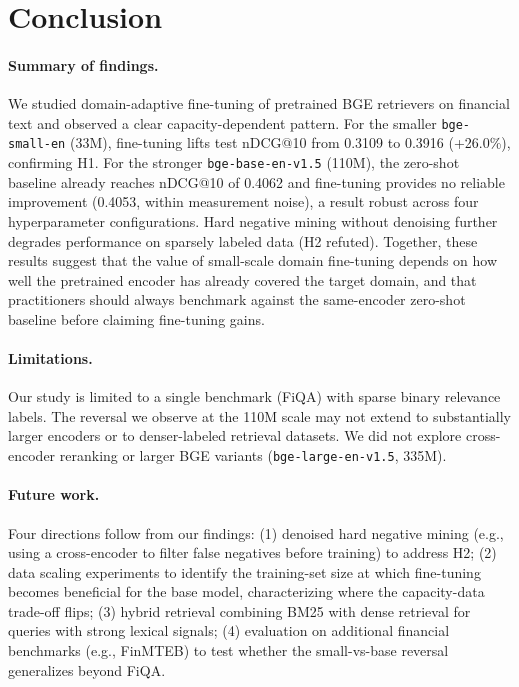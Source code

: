 \documentclass{article} %
\begin{document}
\section{Conclusion}

\paragraph{Summary of findings.}
We studied domain-adaptive fine-tuning of pretrained BGE retrievers on financial text and observed a clear capacity-dependent pattern.
For the smaller \texttt{bge-small-en} (33M), fine-tuning lifts test nDCG@10 from 0.3109 to 0.3916 (+26.0\%), confirming H1.
For the stronger \texttt{bge-base-en-v1.5} (110M), the zero-shot baseline already reaches nDCG@10 of 0.4062 and fine-tuning provides no reliable improvement (0.4053, within measurement noise), a result robust across four hyperparameter configurations.
Hard negative mining without denoising further degrades performance on sparsely labeled data (H2 refuted).
Together, these results suggest that the value of small-scale domain fine-tuning depends on how well the pretrained encoder has already covered the target domain, and that practitioners should always benchmark against the same-encoder zero-shot baseline before claiming fine-tuning gains.

\paragraph{Limitations.}
Our study is limited to a single benchmark (FiQA) with sparse binary relevance labels.
The reversal we observe at the 110M scale may not extend to substantially larger encoders or to denser-labeled retrieval datasets.
We did not explore cross-encoder reranking or larger BGE variants (\texttt{bge-large-en-v1.5}, 335M).

\paragraph{Future work.}
Four directions follow from our findings:
(1) denoised hard negative mining (e.g., using a cross-encoder to filter false negatives before training) to address H2;
(2) data scaling experiments to identify the training-set size at which fine-tuning becomes beneficial for the base model, characterizing where the capacity-data trade-off flips;
(3) hybrid retrieval combining BM25 with dense retrieval for queries with strong lexical signals;
(4) evaluation on additional financial benchmarks (e.g., FinMTEB) to test whether the small-vs-base reversal generalizes beyond FiQA.
\end{document}
